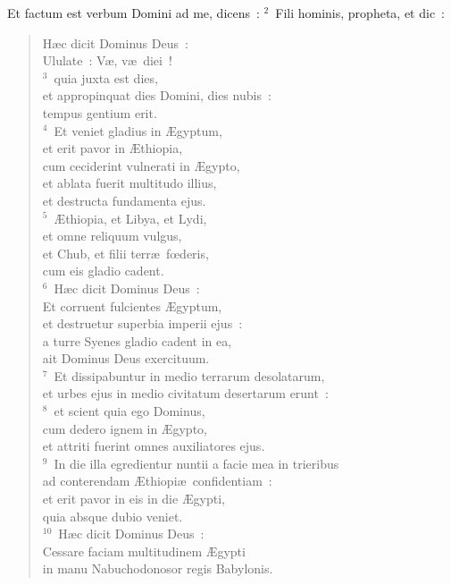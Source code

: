 \lettrine[lines=10,image=true,loversize=0.05,lraise=-0.03]{E}{}t factum est verbum Domini ad me, dicens~:
${}^{2}$~Fili hominis, propheta, et dic~: \begin{flushleft}\begin{verse}H\ae c dicit Dominus Deus~:\\ Ululate~: V\ae , v\ae\ diei~!\\
${}^{3}$~quia juxta est dies,\\ et appropinquat dies Domini, dies nubis~:\\ tempus gentium erit.\\
${}^{4}$~Et veniet gladius in \AE gyptum,\\ et erit pavor in \AE thiopia,\\ cum ceciderint vulnerati in \AE gypto,\\ et ablata fuerit multitudo illius,\\ et destructa fundamenta ejus.\\
${}^{5}$~\AE thiopia, et Libya, et Lydi,\\ et omne reliquum vulgus,\\ et Chub, et filii terr\ae\ fœderis,\\ cum eis gladio cadent.\\
${}^{6}$~H\ae c dicit Dominus Deus~:\\ Et corruent fulcientes \AE gyptum,\\ et destruetur superbia imperii ejus~:\\ a turre Syenes gladio cadent in ea,\\ ait Dominus Deus exercituum.\\
${}^{7}$~Et dissipabuntur in medio terrarum desolatarum,\\ et urbes ejus in medio civitatum desertarum erunt~:\\
${}^{8}$~et scient quia ego Dominus,\\ cum dedero ignem in \AE gypto,\\ et attriti fuerint omnes auxiliatores ejus.\\
${}^{9}$~In die illa egredientur nuntii a facie mea in trieribus\\ ad conterendam \AE thiopi\ae\ confidentiam~:\\ et erit pavor in eis in die \AE gypti,\\ quia absque dubio veniet.\\
${}^{10}$~H\ae c dicit Dominus Deus~:\\ Cessare faciam multitudinem \AE gypti\\ in manu Nabuchodonosor regis Babylonis.\\

\end{verse}
\end{flushleft}
